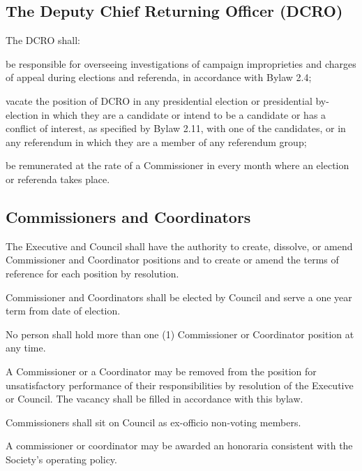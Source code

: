 \subsection {The Deputy Chief Returning Officer (DCRO)} 
\begin{longenum}[ label*=\thesubsection.\arabic*., align=left]
	\item The DCRO shall: 
    \begin{longenum}[ label*=\arabic*., align=left]
		\item be responsible for overseeing investigations of campaign improprieties and charges of appeal during elections and referenda, in accordance with Bylaw 2.4;
        \item vacate the position of DCRO in any presidential election or presidential by-election in which they are a candidate or intend to be a candidate or has a conflict of interest, as specified by Bylaw 2.11, with one of the candidates, or in any referendum in which they are a member of any referendum group; 
        \item be remunerated at the rate of a Commissioner in every month where an election or referenda takes place.
	\end{longenum}    
\end{longenum}
\subsection {Commissioners and Coordinators} 
\begin{longenum}[ label*=\thesubsection.\arabic*., align=left]
	\item The Executive and Council shall have the authority to create, dissolve, or amend Commissioner and Coordinator positions and to create or amend the terms of reference for each position by resolution. 
    \item Commissioner and Coordinators shall be elected by Council and serve a one year term from date of election. 
    \item No person shall hold more than one (1) Commissioner or Coordinator position at any time.
    \item A Commissioner or a Coordinator may be removed from the position for unsatisfactory performance of their responsibilities by resolution of the Executive or Council. The vacancy shall be filled in accordance with this bylaw.  
    \item Commissioners shall sit on Council as ex-officio non-voting members.
    
    \item A commissioner or coordinator may be awarded an honoraria consistent with the Society's operating policy.
\end{longenum}

